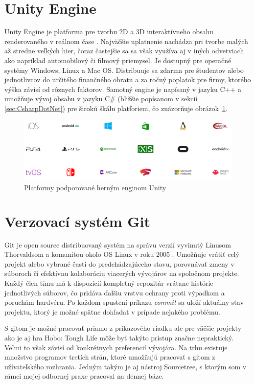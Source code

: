 \documentclass[slovak, bachelorpractice]{diploma}
\begin{document}
\section{Unity Engine}
\label{sec:Unity}
Unity Engine je platforma pre tvorbu 2D a 3D interaktívneho obsahu renderovaného v reálnom čase \cite{Unity}. Najväčšie uplatnenie nachádza pri tvorbe malých až stredne veľkých hier, čoraz častejšie sa sa však využíva aj v iných odvetviach ako napríklad automobilový či filmový priemysel. Je dostupný pre operačné systémy Windows, Linux a Mac OS. Distribuuje sa zdarma pre študentov alebo jednotlivcov do určitého finančného obratu a za ročný poplatok pre firmy, ktorého výška závisí od rôznych faktorov. Samotný engine je napísaný v jazyku C++ a umožňuje vývoj obsahu v jazyku C\# (bližšie popísanom v sekcií \ref{sec:CsharpDotNet}) pre širokú škálu platforiem, čo znázorňuje \mbox{obrázok \ref{pic:UnityPlatforms}}.

\begin{figure}[!htbp]
	\centering
	\includegraphics[width=1\textwidth]{Pictures/platforms.png}
	\caption{Platformy podporované herným enginom Unity \cite{UnityMultiplatform}}
	\label{pic:UnityPlatforms}
\end{figure}

\section{Verzovací systém Git}
\label{sec:Git}
Git je open source distribuovaný systém na správu verzií vyvinutý Linusom Thorvaldsom a komunitou okolo OS Linux v roku 2005 \cite{ProGit}. Umožňuje vrátiť celý projekt alebo vybrané časti do predchádzajúceho stavu, porovnávať zmeny v súboroch či efektívnu kolaboráciu viacerých vývojárov na spoločnom projekte. Každý člen tímu má k dispozícií kompletný repozitár vrátane histórie jednotlivých súborov, čo pridáva ďalšiu vrstvu ochrany proti výpadkom a poruchám hardvéru. Po každom spustení príkazu \textit{commit} sa uloží aktuálny stav projektu, ktorý je možné spätne dohľadať v prípade nejakého problému.

S gitom je možné pracovať priamo z príkazového riadku ale pre väčšie projekty ako je aj hra Hobo: Tough Life môže byť takýto prístup značne nepraktický. Veľmi to však závisí od konkrétnych preferencií vývojára. Na trhu existuje množstvo programov tretích strán, ktoré umožňujú pracovať s gitom z užívateľského rozhrania. Jedným takým je aj nástroj Sourcetree, s ktorým som v rámci mojej odbornej praxe pracoval na dennej báze.
\end{document}
